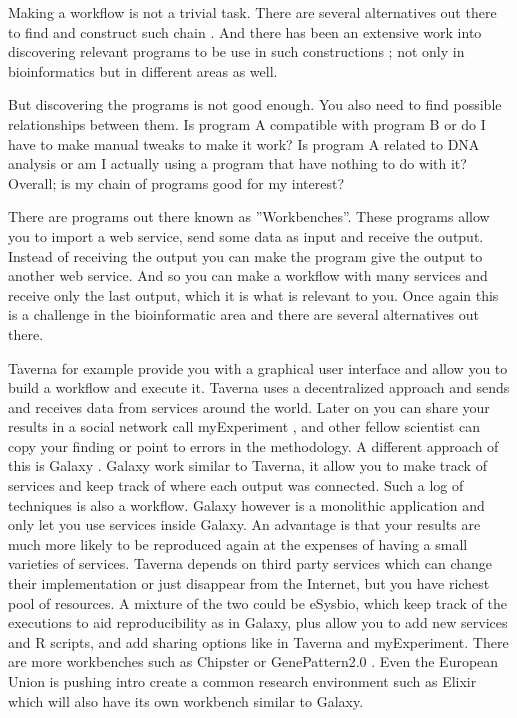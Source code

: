 \documentclass[a4paper,10pt]{article}
\begin{document}
Making a workflow is not a trivial task. There are several alternatives out there to find and construct such chain \cite{1314748} \cite{uddi}. And there has been an extensive work into discovering relevant programs to be use in such constructions \cite{1}; not only in bioinformatics but in different areas as well.\vspace{3 mm}

But discovering the programs is not good enough. You also need to find possible relationships between them. Is program A compatible with program B or do I have to make manual tweaks to make it work? Is program A related to DNA analysis or am I actually using a program that have nothing to do with it? Overall; is my chain of programs good for my interest? \vspace{3 mm}

There are programs out there known as ''Workbenches''. These programs allow you to import a web service, send some data as input and receive the output. Instead of receiving the output you can make the program give the output to another web service. And so you can make a workflow with many services and receive only the last output, which it is what is relevant to you. Once again this is a challenge in the bioinformatic area and there are several alternatives out there.\vspace{3 mm}

Taverna \cite{PubMed_15201187} \cite{taverna} for example provide you with a graphical user interface and allow you to build a workflow and execute it. Taverna uses a decentralized approach and sends and receives data from services around the world. Later on you can share your results in a social network call myExperiment \cite{myexperiment} \cite{DeRoure2009561}, and other fellow scientist can copy your finding or point to errors in the methodology. A different approach of this is Galaxy\cite{PubMed_16169926} \cite{galaxy}. Galaxy work similar to Taverna, it allow you to make track of services and keep track of where each output was connected. Such a log of techniques is also a workflow. Galaxy  however is a monolithic application and only let you use services inside Galaxy. An advantage is that your results are much more likely to be reproduced again at the expenses of having a small varieties of services. Taverna depends on third party services which can change their implementation or just disappear from the Internet, but you have richest pool of resources. A mixture of the two could be eSysbio,\cite{Edlund:2011:PCE:1996121.1996129} \cite{esysbio2} \cite{esysbio} which keep track of the executions to aid reproducibility as in Galaxy, plus allow you to add new services and R scripts, and add sharing options like in Taverna and myExperiment. There are more workbenches such as Chipster \cite{chipster} \cite{PubMed_21999641} or GenePattern2.0 \cite{PubMed_16642009} \cite{genepattern}. Even the European Union is pushing intro create a common research environment such as Elixir \cite{elixir} which will also have its own workbench similar to Galaxy.\vspace{5 mm}
\end{document}
